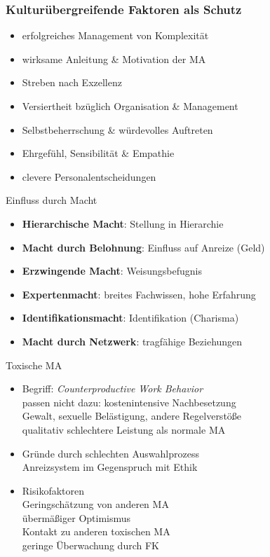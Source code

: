 \documentclass{cheatsheet}
\begin{document}
    \begin{normbox}{\subsubsection{Kulturübergreifende Faktoren als Schutz}}
        \begin{itemize}
            \item erfolgreiches Management von Komplexität
            \item wirksame Anleitung \& Motivation der MA
            \item Streben nach Exzellenz
            \item Versiertheit bzüglich Organisation \& Management
            \item Selbstbeherrschung \& würdevolles Auftreten
            \item Ehrgefühl, Sensibilität \& Empathie
            \item clevere Personalentscheidungen
        \end{itemize}
    \end{normbox}
    \begin{sectionbox}{Einfluss durch Macht}
        \begin{itemize}
            \item \textbf{Hierarchische Macht}: Stellung in Hierarchie
            \item \textbf{Macht durch Belohnung}: Einfluss auf Anreize (Geld)
            \item \textbf{Erzwingende Macht}: Weisungsbefugnis
            \item \textbf{Expertenmacht}: breites Fachwissen, hohe Erfahrung
            \item \textbf{Identifikationsmacht}: Identifikation (Charisma)
            \item \textbf{Macht durch Netzwerk}: tragfähige Beziehungen
        \end{itemize}
    \end{sectionbox}
    \begin{sectionbox}{Toxische MA}
        \begin{itemize}
            \item Begriff: \emph{Counterproductive Work Behavior}\\
            \ra passen nicht dazu: kostenintensive Nachbesetzung\\
            \ra Gewalt, sexuelle Belästigung, andere Regelverstöße\\
            \ra qualitativ schlechtere Leistung als normale MA
            \item Gründe durch schlechten Auswahlprozess\\
            \ra Anreizsystem im Gegenspruch mit Ethik
            \item Risikofaktoren\\
            \ra Geringschätzung von anderen MA\\
            \ra übermäßiger Optimismus\\
            \ra Kontakt zu anderen toxischen MA\\
            \ra geringe Überwachung durch FK
        \end{itemize}
    \end{sectionbox}
\end{document}
